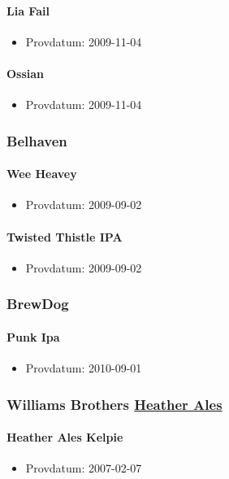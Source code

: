 \documentclass[11pt]{article}
\begin{document}
\paragraph{Lia Fail}
\label{sec:org1beca17}
\begin{itemize}
\item Provdatum: 2009-11-04
\end{itemize}
\paragraph{Ossian}
\label{sec:org629d076}
\begin{itemize}
\item Provdatum: 2009-11-04
\end{itemize}
\subsubsection{Belhaven}
\label{sec:org7eeeffd}
\paragraph{Wee Heavey}
\label{sec:org9eb9846}
\begin{itemize}
\item Provdatum: 2009-09-02
\end{itemize}
\paragraph{Twisted Thistle IPA}
\label{sec:orgabed12b}
\begin{itemize}
\item Provdatum: 2009-09-02
\end{itemize}
\subsubsection{BrewDog}
\label{sec:org4565bd7}
\paragraph{Punk Ipa}
\label{sec:orga21b203}
\begin{itemize}
\item Provdatum: 2010-09-01
\end{itemize}
\subsubsection{Williams Brothers \underline{Heather Ales}}
\label{sec:org842a93f}
\paragraph{Heather Ales Kelpie}
\label{sec:orgd33546a}
\begin{itemize}
\item Provdatum: 2007-02-07
\end{itemize}
\end{document}

